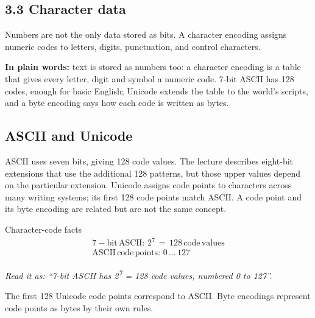 \documentclass[11pt]{article}
\begin{document}
\begin{keepsection}
\section{3.3 Character data}

Numbers are not the only data stored as bits. A character encoding assigns numeric codes to letters, digits, punctuation, and control characters.

\begin{plainbox}\textbf{In plain words:} text is stored as numbers too: a character encoding is a table that gives every letter, digit and symbol a numeric code. 7-bit ASCII has 128 codes, enough for basic English; Unicode extends the table to the world’s scripts, and a byte encoding says how each code is written as bytes.\end{plainbox}

\begin{keepsection}
\subsection{ASCII and Unicode}

ASCII uses seven bits, giving 128 code values. The lecture describes eight-bit extensions that use the additional 128 patterns, but those upper values depend on the particular extension. Unicode assigns code points to characters across many writing systems; its first 128 code points match ASCII. A code point and its byte encoding are related but are not the same concept.

\begin{equationcard}{Character-code facts}
\[ \begin{gathered} 7-\text{bit}\, \text{ASCII}:\, 2^{7}\, =\, 128\, \text{code}\, \text{values} \\ \text{ASCII}\, \text{code}\, \text{points}:\, 0\, …\, 127 \end{gathered} \]
{\small \emph{Read it as: “7-bit ASCII has 2\textsuperscript{7} = 128 code values, numbered 0 to 127”.}\par The first 128 Unicode code points correspond to ASCII. Byte encodings represent code points as bytes by their own rules.}
\end{equationcard}


\end{keepsection}
\end{keepsection}
\end{document}
